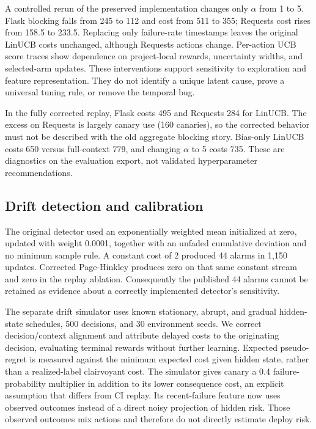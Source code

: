 \documentclass[
  10pt,
]{article}
\begin{document}
A controlled rerun of the preserved implementation changes only
\(\alpha\) from 1 to 5. Flask blocking falls from 245 to 112 and cost
from 511 to 355; Requests cost rises from 158.5 to 233.5. Replacing only
failure-rate timestamps leaves the original LinUCB costs unchanged,
although Requests actions change. Per-action UCB score traces show
dependence on project-local rewards, uncertainty widths, and
selected-arm updates. These interventions support sensitivity to
exploration and feature representation. They do not identify a unique
latent cause, prove a universal tuning rule, or remove the temporal bug.

In the fully corrected replay, Flask costs 495 and Requests 284 for
LinUCB. The excess on Requests is largely canary use (160 canaries), so
the corrected behavior must not be described with the old aggregate
blocking story. Bias-only LinUCB costs 650 versus full-context 779, and
changing \(\alpha\) to 5 costs 735. These are diagnostics on the
evaluation export, not validated hyperparameter recommendations.

\subsection{Drift detection and
calibration}\label{drift-detection-and-calibration}

The original detector used an exponentially weighted mean initialized at
zero, updated with weight 0.0001, together with an unfaded cumulative
deviation and no minimum sample rule. A constant cost of 2 produced 44
alarms in 1,150 updates. Corrected Page-Hinkley produces zero on that
same constant stream and zero in the replay ablation. Consequently the
published 44 alarms cannot be retained as evidence about a correctly
implemented detector's sensitivity.

The separate drift simulator uses known stationary, abrupt, and gradual
hidden-state schedules, 500 decisions, and 30 environment seeds. We
correct decision/context alignment and attribute delayed costs to the
originating decision, evaluating terminal rewards without further
learning. Expected pseudo-regret is measured against the minimum
expected cost given hidden state, rather than a realized-label
clairvoyant cost. The simulator gives canary a 0.4 failure-probability
multiplier in addition to its lower consequence cost, an explicit
assumption that differs from CI replay. Its recent-failure feature now
uses observed outcomes instead of a direct noisy projection of hidden
risk. Those observed outcomes mix actions and therefore do not directly
estimate deploy risk.
\end{document}
